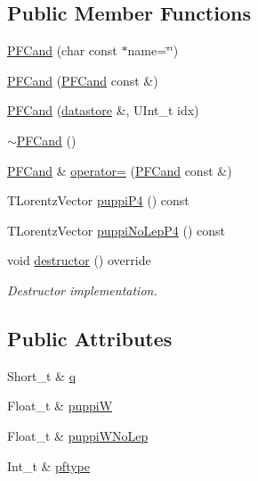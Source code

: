 \subsection*{Public Member Functions}
\begin{DoxyCompactItemize}
\item 
\hyperlink{classpanda_1_1PFCand_ae935e8e606a122baaeefa1ec62f16325}{PFCand} (char const $\ast$name=\char`\"{}\char`\"{})
\item 
\hyperlink{classpanda_1_1PFCand_a3ffef86621fd1e30c54ca4435f692a8d}{PFCand} (\hyperlink{classpanda_1_1PFCand}{PFCand} const \&)
\item 
\hyperlink{classpanda_1_1PFCand_a3cc3d580fa70ef5e61b72f35ca246585}{PFCand} (\hyperlink{structpanda_1_1Element_1_1datastore}{datastore} \&, UInt\_\-t idx)
\item 
\hyperlink{classpanda_1_1PFCand_a3e01d8aefa63f555e73e160d9e585984}{$\sim$PFCand} ()
\item 
\hyperlink{classpanda_1_1PFCand}{PFCand} \& \hyperlink{classpanda_1_1PFCand_ad32d7ae95ef68eb076604648684aca06}{operator=} (\hyperlink{classpanda_1_1PFCand}{PFCand} const \&)
\item 
TLorentzVector \hyperlink{classpanda_1_1PFCand_a5c5f399c11e2f6aa60e8f1c093946cc0}{puppiP4} () const 
\item 
TLorentzVector \hyperlink{classpanda_1_1PFCand_a3091b11c1f77e1a3ab0ed5954baa5354}{puppiNoLepP4} () const 
\item 
void \hyperlink{classpanda_1_1PFCand_a30a87718470988f020ce75d7e990868b}{destructor} () override
\begin{DoxyCompactList}\small\item\em Destructor implementation. \item\end{DoxyCompactList}\end{DoxyCompactItemize}
\subsection*{Public Attributes}
\begin{DoxyCompactItemize}
\item 
Short\_\-t \& \hyperlink{classpanda_1_1PFCand_ab969e02d290c672ecaf2526e695acab0}{q}
\item 
Float\_\-t \& \hyperlink{classpanda_1_1PFCand_adb468a1207be96d664eb843e3eca83aa}{puppiW}
\item 
Float\_\-t \& \hyperlink{classpanda_1_1PFCand_a45d26010870903cbaa8f449fba20037d}{puppiWNoLep}
\item 
Int\_\-t \& \hyperlink{classpanda_1_1PFCand_a3a9d989992c79a41f3dc4585384b5b21}{pftype}
\end{DoxyCompactItemize}
